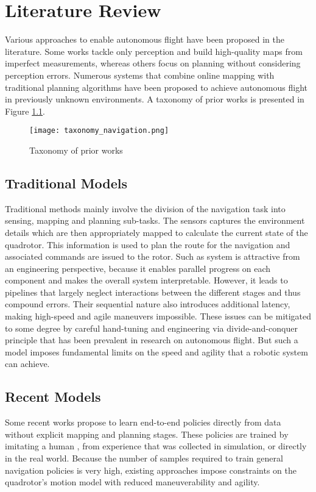 \chapter{Literature Review} 

Various approaches to enable autonomous flight have been proposed in the literature. Some works tackle only perception and build high-quality maps from imperfect measurements, whereas others
focus on planning without considering perception errors. Numerous systems that combine online mapping with traditional planning algorithms have been proposed to achieve autonomous flight in previously unknown environments. A taxonomy of prior works is
presented in Figure \ref{fig:taxonomy}.


\begin{figure}[h]
	\begin{center}
		\texttt{[image: taxonomy\_navigation.png]}
		\caption{Taxonomy of prior works}
		\label{fig:taxonomy}
	\end{center}
\end{figure}

\section{Traditional Models}
Traditional methods mainly involve the division of the navigation task into sensing, mapping and planning sub-tasks. The sensors captures the environment details which are then appropriately mapped to calculate the current state of the quadrotor. This information is used to plan the route for the navigation and associated commands are issued to the rotor. Such as system is attractive from an engineering perspective, because
it enables parallel progress on each component and makes the overall system interpretable. However, it leads to pipelines that largely
neglect interactions between the different stages and thus compound
errors. Their sequential nature also introduces additional latency,
making high-speed and agile maneuvers impossible.
These issues can be mitigated to some degree by careful hand-tuning and engineering via divide-and-conquer principle that has been
prevalent in research on autonomous flight. But such a model imposes fundamental limits on the speed and agility
that a robotic system can achieve.

\section{Recent Models}
Some recent works propose
to learn end-to-end policies directly from data without explicit mapping
and planning stages. These policies are trained by imitating a
human , from experience that was collected in simulation,
or directly in the real world.
Because the number of samples
required to train general navigation policies is very high, existing
approaches impose constraints on the quadrotor’s motion model with reduced maneuverability
and agility. 

